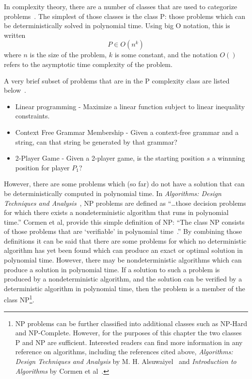 In complexity theory, there are a number of classes that are used to categorize
problems~\cite{alsuwaiyel1999algorithms,Cormen:2009:IAT:1614191}. The simplest
of those classes is the class P: those problems which can be deterministically
solved in polynomial time. Using big O notation, this is written
\begin{equation*}
P \in O(n^{k})
\end{equation*}
where \(n\) is the size of the problem, \(k\) is some constant, and the
notation \(O()\) refers to the asymptotic time complexity of the problem.

A very brief subset of problems that are in the P complexity class are listed
below~\cite{greenlaw1991compendium}.

\begin{itemize}
\item{Linear programming - Maximize a linear function subject to linear
inequality constraints.} 
\item{Context Free Grammar Membership - Given a context-free grammar and a
string, can that string be generated by that grammar?}
\item {2-Player Game - Given a 2-player game, is the starting position \(s\) a
winnning position for player \(P_1\)?}
\end{itemize}

However, there are some problems which (so far) do not have a solution that can
be deterministically computed in polynomial time. In \emph{Algorithms: Design
Techniques and Analysis}~\cite{alsuwaiyel1999algorithms}, NP problems are
defined as ``\ldots those decision problems for which there exists a
nondeterministic algorithm that runs in polynomial time.'' Cormen et al, provide
this simple definition of NP: ``The class NP consists of those problems that are
`verifiable' in polynomial time~\cite{Cormen:2009:IAT:1614191}.'' By combining
those definitions it can be said that there are some problems for which no
deterministic algorithm has yet been found which can produce an exact or optimal solution in
polynomial time. However, there may be nondeterministic algorithms which can
produce a solution in polynomial time. If a solution to such a problem is
produced by a nondeterministic algorithm, and the solution can be verified by a
deterministic algorithm in polynomial time, then the problem is a member of the
class NP\footnote{NP problems can be further classified into additional
classes such as NP-Hard and NP-Complete. However, for the purposes of this
chapter the two classes P and NP are sufficient. Interested readers can find
more information in any reference on algorithms, including the references cited
above, \emph{Algorithms: Design Techniques and Analysis} by M. H.
Alsuwaiyel~\cite{alsuwaiyel1999algorithms} and \emph{Introduction to Algorithms}
by Cormen et al~\cite{Cormen:2009:IAT:1614191}.}.

